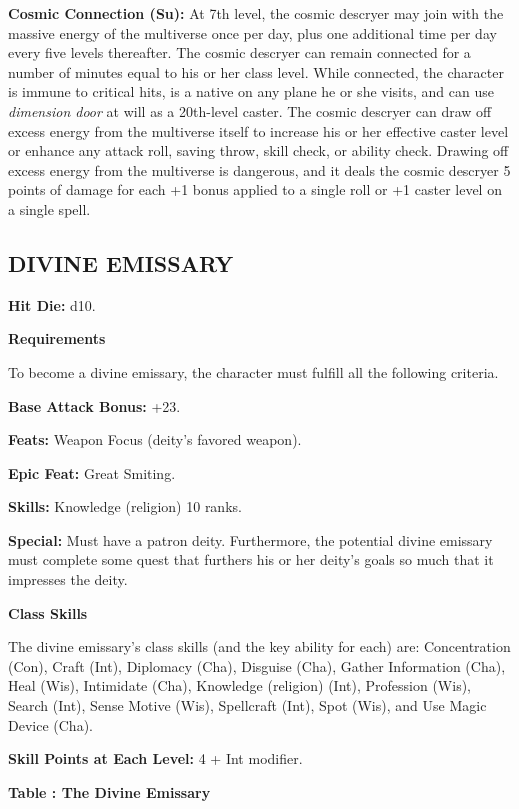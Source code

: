 \documentclass{article}
\begin{document}
\textbf{Cosmic Connection (Su):} At 7th level, the cosmic descryer may join with 
the massive energy of the multiverse once per day, plus one additional time per 
day every five levels thereafter. The cosmic descryer can remain connected for 
a number of minutes equal to his or her class level. While connected, the character 
is immune to critical hits, is a native on any plane he or she visits, and can 
use \textit{dimension door }at will as a 20th-level caster. The cosmic descryer 
can draw off excess energy from the multiverse itself to increase his or her effective 
caster level or enhance any attack roll, saving throw, skill check, or ability 
check. Drawing off excess energy from the multiverse is dangerous, and it deals 
the cosmic descryer 5 points of damage for each +1 bonus applied to a single roll 
or +1 caster level on a single spell.

\vspace{12pt}
\subsection*{{\LARGE{}DIVINE EMISSARY }}

\textbf{Hit Die:} d10. 

\textbf{Requirements}

To become a divine emissary, the character must fulfill all the following criteria. 

\textbf{Base Attack Bonus:} +23. 

\textbf{Feats:} Weapon Focus (deity's favored weapon). 

\textbf{Epic Feat:} Great Smiting. 

\textbf{Skills:} Knowledge (religion) 10 ranks. 

\textbf{Special:} Must have a patron deity. Furthermore, the potential divine emissary 
must complete some quest that furthers his or her deity's goals so much that it 
impresses the deity.

\textbf{Class Skills}

The divine emissary's class skills (and the key ability for each) are: Concentration 
(Con), Craft (Int), Diplomacy (Cha), Disguise (Cha), Gather Information (Cha), 
Heal (Wis), Intimidate (Cha), Knowledge (religion) (Int), Profession (Wis), Search 
(Int), Sense Motive (Wis), Spellcraft (Int), Spot (Wis), and Use Magic Device (Cha). 

\textbf{Skill Points at Each Level:} 4 + Int modifier.  

\vspace{12pt}
\textbf{Table : The Divine Emissary }
\end{document}

